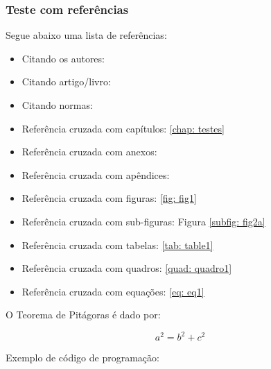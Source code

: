 \subsubsection{Teste com referências}

Segue abaixo uma lista de referências:

\begin{itemize}%
  \item Citando os autores: 
  \item Citando artigo/livro: \cite{Ciresan2012,SMIRNOV201489}
  \item Citando normas: \cite{NBR6023:2000}
  \item Referência cruzada com capítulos: \autoref{chap: testes}
  \item Referência cruzada com anexos: 
  \item Referência cruzada com apêndices: 
  \item Referência cruzada com figuras: \autoref{fig: fig1}
  \item Referência cruzada com sub-figuras: Figura \ref{subfig: fig2a}
  \item Referência cruzada com tabelas: \autoref{tab: table1}
  \item Referência cruzada com quadros: \autoref{quad: quadro1}
  \item Referência cruzada com equações: \autoref{eq: eq1}
\end{itemize}
    

O Teorema de Pitágoras é dado por:

\begin{equation}
    \label{eq: eq1}
	a^{2}= b^{2}+c^{2}
\end{equation}

Exemplo de código de programação:
  
